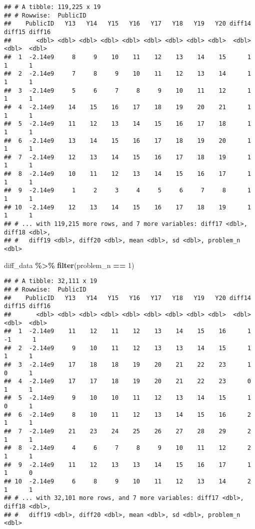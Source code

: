 \documentclass[
]{article}
\newenvironment{Shaded}{\begin{snugshade}}{\end{snugshade}}
\newcommand{\DecValTok}[1]{\textcolor[rgb]{0.00,0.00,0.81}{#1}}
\newcommand{\KeywordTok}[1]{\textcolor[rgb]{0.13,0.29,0.53}{\textbf{#1}}}
\newcommand{\NormalTok}[1]{#1}
\newcommand{\OperatorTok}[1]{\textcolor[rgb]{0.81,0.36,0.00}{\textbf{#1}}}
\newcommand{\StringTok}[1]{\textcolor[rgb]{0.31,0.60,0.02}{#1}}
\begin{document}
\begin{verbatim}
## # A tibble: 119,225 x 19
## # Rowwise:  PublicID
##    PublicID   Y13   Y14   Y15   Y16   Y17   Y18   Y19   Y20 diff14 diff15 diff16
##       <dbl> <dbl> <dbl> <dbl> <dbl> <dbl> <dbl> <dbl> <dbl>  <dbl>  <dbl>  <dbl>
##  1  -2.14e9     8     9    10    11    12    13    14    15      1      1      1
##  2  -2.14e9     7     8     9    10    11    12    13    14      1      1      1
##  3  -2.14e9     5     6     7     8     9    10    11    12      1      1      1
##  4  -2.14e9    14    15    16    17    18    19    20    21      1      1      1
##  5  -2.14e9    11    12    13    14    15    16    17    18      1      1      1
##  6  -2.14e9    13    14    15    16    17    18    19    20      1      1      1
##  7  -2.14e9    12    13    14    15    16    17    18    19      1      1      1
##  8  -2.14e9    10    11    12    13    14    15    16    17      1      1      1
##  9  -2.14e9     1     2     3     4     5     6     7     8      1      1      1
## 10  -2.14e9    12    13    14    15    16    17    18    19      1      1      1
## # ... with 119,215 more rows, and 7 more variables: diff17 <dbl>, diff18 <dbl>,
## #   diff19 <dbl>, diff20 <dbl>, mean <dbl>, sd <dbl>, problem_n <dbl>
\end{verbatim}

\begin{Shaded}
\begin{Highlighting}[]
\NormalTok{diff\_data }\OperatorTok{\%\textgreater{}\%}\StringTok{ }\KeywordTok{filter}\NormalTok{(problem\_n }\OperatorTok{==}\StringTok{ }\DecValTok{1}\NormalTok{)}
\end{Highlighting}
\end{Shaded}

\begin{verbatim}
## # A tibble: 32,111 x 19
## # Rowwise:  PublicID
##    PublicID   Y13   Y14   Y15   Y16   Y17   Y18   Y19   Y20 diff14 diff15 diff16
##       <dbl> <dbl> <dbl> <dbl> <dbl> <dbl> <dbl> <dbl> <dbl>  <dbl>  <dbl>  <dbl>
##  1  -2.14e9    11    12    11    12    13    14    15    16      1     -1      1
##  2  -2.14e9     9    10    11    12    13    13    14    15      1      1      1
##  3  -2.14e9    17    18    18    19    20    21    22    23      1      0      1
##  4  -2.14e9    17    17    18    19    20    21    22    23      0      1      1
##  5  -2.14e9     9    10    10    11    12    13    14    15      1      0      1
##  6  -2.14e9     8    10    11    12    13    14    15    16      2      1      1
##  7  -2.14e9    21    23    24    25    26    27    28    29      2      1      1
##  8  -2.14e9     4     6     7     8     9    10    11    12      2      1      1
##  9  -2.14e9    11    12    13    13    14    15    16    17      1      1      0
## 10  -2.14e9     6     8     9    10    11    12    13    14      2      1      1
## # ... with 32,101 more rows, and 7 more variables: diff17 <dbl>, diff18 <dbl>,
## #   diff19 <dbl>, diff20 <dbl>, mean <dbl>, sd <dbl>, problem_n <dbl>
\end{verbatim}
\end{document}
